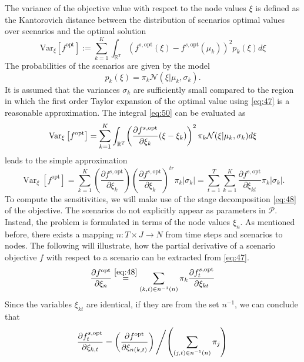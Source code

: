 The variance of the objective value with respect to the node values $\xi$ is defined as the Kantorovich distance between the distribution of scenarios optimal values over scenarios and the optimal solution
\begin{equation}
  \label{eq:50}
  \mathrm{Var}_{\xi}\left[f^{\mathrm{opt}}\right] :=  \sum_{k=1}^K\int_{\mathbb{R}^T} \left(f^{s,\mathrm{opt}}(\xi)-f^{s,\mathrm{opt}}(\mu_k)\right)^2p_k(\xi)d\xi
\end{equation}
The probabilities of the scenarios are given by the model
\begin{equation}
  \label{eq:55}
  p_k(\xi) = \pi_k\mathcal{N}(\xi|\mu_{k},\sigma_k).
\end{equation}
It is assumed that the variances $\sigma_k$ are sufficiently small compared to the region in which the first order Taylor expansion of the optimal value using \eqref{eq:47} is a reasonable approximation.
The integral \eqref{eq:50} can be evaluated as
\begin{equation}
  \label{eq:52}
  \operatorname{Var}_\xi\left[f^{\mathrm{opt}}\right] = \sum_{k=1}^K\int_{\mathbb{R}^T} \mathopen{}\left(\frac{\partial f^{s,\mathrm{opt}}}{\partial \xi_k}(\xi-\xi_k)\right)^2\pi_k\mathcal{N}(\xi|\mu_k,\sigma_k)d\xi
\end{equation}
leads to the simple approximation
\begin{equation}
  \label{eq:54}
  \operatorname{Var}_\xi\left[f^{\mathrm{opt}}\right] = \sum_{k=1}^K \left(\frac{\partial f^{s,\mathrm{opt}}}{\partial\xi_k} \right)\left(\frac{\partial f^{s,\mathrm{opt}}}{\partial\xi_k} \right)^{tr}\pi_k|\sigma_k| = \sum_{t=1}^T\sum_{k=1}^K\frac{\partial f^{s,\mathrm{opt}}}{\partial \xi_{kt}} \pi_k|\sigma_k|.
\end{equation}
To compute the sensitivities, we will make use of the stage decomposition \eqref{eq:48} of the objective.
The scenarios do not explicitly appear as parameters in $\mathcal{P}$.
Instead, the problem is formulated in terms of the node values $\xi_n$.
As mentioned before, there exists a mapping $n:T\times J\rightarrow N$ from time steps and scenarios to nodes.
The following will illustrate, how the partial derivative of a scenario objective $f$ with respect to a scenario can be extracted from \eqref{eq:47}.
\begin{equation}
  \label{eq:51}
  \frac{\partial f^{\mathrm{opt}}}{\partial \xi_n} \overset{\eqref{eq:48}}{=} \sum_{(k,t)\in n^{-1}(n)}\pi_k\frac{\partial f_{t}^{s,\mathrm{opt}}}{\partial \xi_{kt}}
\end{equation}
Since the variables $\xi_{kt}$ are identical, if they are from the set $n^{-1}$, we can conclude that
\begin{equation}
  \label{eq:56}
  \frac{\partial f_t^{s,\mathrm{opt}}}{\partial \xi_{k,t}} = \left(\frac{\partial f^{\mathrm{opt}}}{\partial \xi_{n(k,t)}}\right) \left/ \left(\sum_{(j,t)\in n^{-1}(n)} \pi_j\right)\right.
\end{equation}

